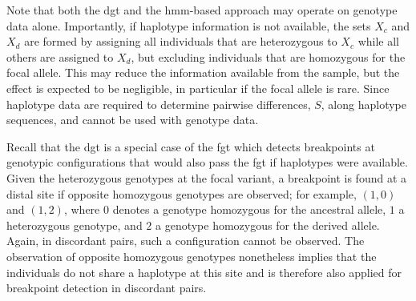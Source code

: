 Note that both the \gls{dgt} and the \gls{hmm}-based approach may operate on genotype data alone.
Importantly, if haplotype information is not available, the sets $X_c$ and $X_d$ are formed by assigning all individuals that are heterozygous to $X_c$ while all others are assigned to $X_d$, but excluding individuals that are homozygous for the focal allele.
This may reduce the information available from the sample, but the effect is expected to be negligible, in particular if the focal allele is rare.
Since haplotype data are required to determine pairwise differences, $S$, along haplotype sequences, \ClockM and \ClockC cannot be used with genotype data.

Recall that the \gls{dgt} is a special case of the \gls{fgt} which detects breakpoints at genotypic configurations that would also pass the \gls{fgt} if haplotypes were available.
Given the  heterozygous genotypes at the focal variant, a breakpoint is found at a distal site if opposite homozygous genotypes are observed; for example, ${(1,0)}$ and ${(1,2)}$, where $0$ denotes a genotype homozygous for the ancestral allele, $1$ a heterozygous genotype, and $2$ a genotype homozygous for the derived allele.
Again, in discordant pairs, such a configuration cannot be observed.
The observation of opposite homozygous genotypes nonetheless implies that the  individuals do not share a haplotype at this site and is therefore also applied for breakpoint detection in discordant pairs.

%

%

